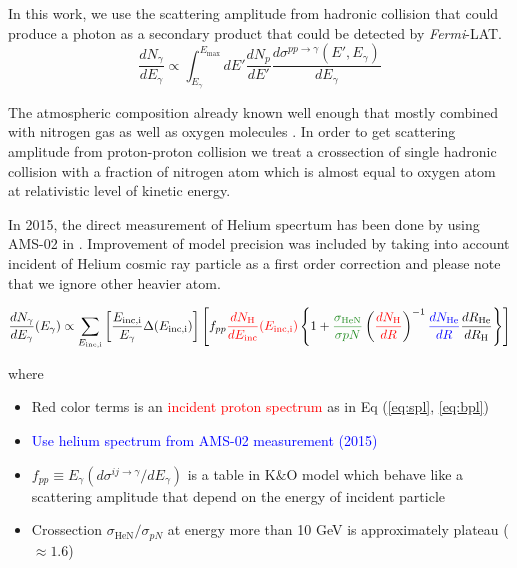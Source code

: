In this work, we use the scattering amplitude from hadronic collision \cite{K&Omodel} that could produce a photon as a secondary product that could be detected by \textit{Fermi}-LAT.
\begin{equation}
    \frac{dN_\gamma}{dE_\gamma} \propto \int^{E_{\text{max}}}_{E_\gamma} dE'\frac{dN_p}{dE'} \frac{d\sigma^{pp\rightarrow\gamma}(E',E_\gamma)}{dE_\gamma}
\end{equation}
\par The atmospheric composition already known well enough that mostly combined with nitrogen gas as well as oxygen molecules \cite{atmosCompos}. 
In order to get scattering amplitude from proton-proton collision we treat a crossection of single hadronic collision with a fraction of nitrogen atom which is almost equal to oxygen atom \cite{WAtwater} at relativistic level of kinetic energy.
\par In 2015, the direct measurement of Helium specrtum has been done by using AMS-02 in \cite{AMS-02Helium}. Improvement of model precision was included by taking into account incident of Helium cosmic ray particle as a first order correction and please note that we ignore other heavier atom.

\begin{equation}
    \frac{dN_{\gamma}}{dE_\gamma}(E_\gamma) \propto \sum_{E_{\text{inc,i}}}\left[\frac{E_{\text{inc,i}}}{E_{\gamma}}\Delta(E_{\text{inc,i}}) \right]\left[ f_{pp}\textcolor{red}{\frac{dN_\text{H}}{dE_{\text{inc}}}(E_{\text{inc,i}})}\left\{ 1+\textcolor{olivegreen}{\frac{\sigma_{\text{HeN}}}{\sigma{pN}}}\left(\textcolor{red}{\frac{dN_{\text{H}}}{dR}}\right)^{-1} \textcolor{blue}{\frac{dN_{\text{He}}}{dR}} \frac{dR_{\text{He}}}{dR_{\text{H}}}  \right\}\right]
\end{equation}

where
\begin{itemize}
    \item Red color terms is an \textcolor{red}{incident proton spectrum} as in Eq (\ref{eq:spl}, \ref{eq:bpl})
    \item \textcolor{blue}{Use helium spectrum from AMS-02 measurement (2015)}
    \item $f_{pp}\equiv E_\gamma(d\sigma^{ij\rightarrow\gamma}/dE_\gamma)$ is a table in K$\&$O model which behave like a scattering amplitude
    that depend on the energy of incident particle
    \item Crossection \textcolor{olivegreen}{$\sigma_{\text{HeN}}/\sigma_{pN}$} at energy more than 10 GeV is approximately plateau ($\approx 1.6$)
\end{itemize}


